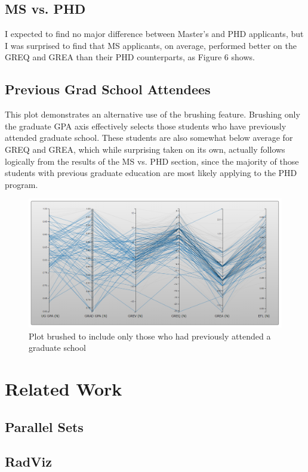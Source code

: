 \documentclass[]{article}
\begin{document}
	\subsection {MS vs. PHD}
		I expected to find no major difference between Master's and PHD applicants, but I was surprised to find that MS applicants, on average, performed better on the GREQ and GREA than their PHD counterparts, as Figure 6 shows.

		
	\subsection{Previous Grad School Attendees}
		This plot demonstrates an alternative use of the brushing feature. Brushing only the graduate GPA axis effectively selects those students who have previously attended graduate school. These students are also somewhat below average for GREQ and GREA, which while surprising taken on its own, actually follows logically from the results of the MS vs. PHD section, since the majority of those students with previous graduate education are most likely applying to the PHD program.
		\begin{figure}[h]
			\includegraphics[width=\linewidth]{grads_only.png}
			\caption{Plot brushed to include only those who had previously attended a graduate school}
			\label{fig:MS_PHD}
		\end{figure}
	\pagebreak
\section{Related Work}
	\subsection{Parallel Sets}
	
	\subsection{RadViz}
	
\end{document}
